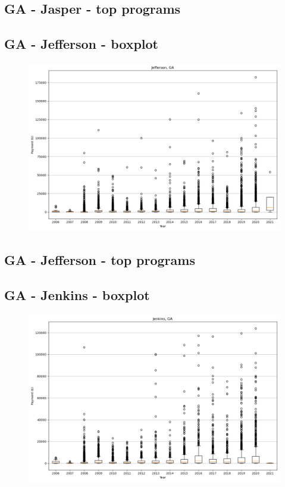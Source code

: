 \subsection*{GA - Jasper - top programs}

\newpage
\subsection*{GA - Jefferson - boxplot}
\begin{figure}[h]
\centering
\includegraphics[width=7in]{../output/boxplots/counties/Jefferson-GA_boxplot.png}
\end{figure}


\subsection*{GA - Jefferson - top programs}

\newpage
\subsection*{GA - Jenkins - boxplot}
\begin{figure}[h]
\centering
\includegraphics[width=7in]{../output/boxplots/counties/Jenkins-GA_boxplot.png}
\end{figure}


